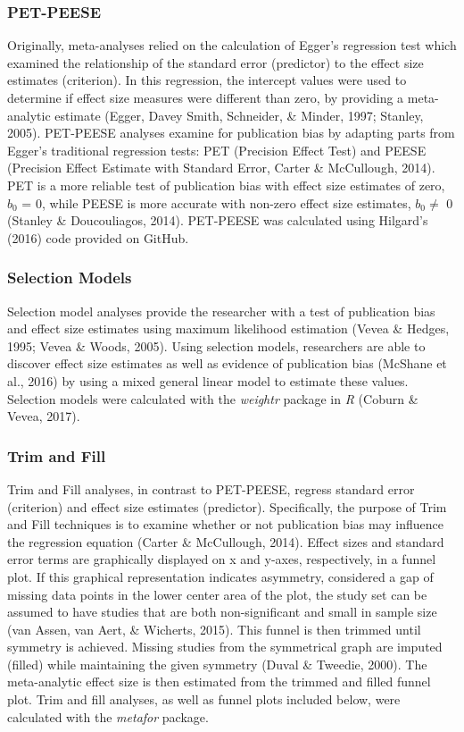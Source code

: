 \documentclass[man, mask]{apa6}
\theoremstyle{definition}
\theoremstyle{definition}
\theoremstyle{definition}
\theoremstyle{remark}
\begin{document}
\subsubsection{PET-PEESE}\label{pet-peese}

Originally, meta-analyses relied on the calculation of Egger's
regression test which examined the relationship of the standard error
(predictor) to the effect size estimates (criterion). In this
regression, the intercept values were used to determine if effect size
measures were different than zero, by providing a meta-analytic estimate
(Egger, Davey Smith, Schneider, \& Minder, 1997; Stanley, 2005).
PET-PEESE analyses examine for publication bias by adapting parts from
Egger's traditional regression tests: PET (Precision Effect Test) and
PEESE (Precision Effect Estimate with Standard Error, Carter \&
McCullough, 2014). PET is a more reliable test of publication bias with
effect size estimates of zero, \(b_0\) = 0, while PEESE is more accurate
with non-zero effect size estimates, \(b_0 \neq\) 0 (Stanley \&
Doucouliagos, 2014). PET-PEESE was calculated using Hilgard's (2016)
code provided on GitHub.

\subsubsection{Selection Models}\label{selection-models}

Selection model analyses provide the researcher with a test of
publication bias and effect size estimates using maximum likelihood
estimation (Vevea \& Hedges, 1995; Vevea \& Woods, 2005). Using
selection models, researchers are able to discover effect size estimates
as well as evidence of publication bias (McShane et al., 2016) by using
a mixed general linear model to estimate these values. Selection models
were calculated with the \emph{weightr} package in \emph{R} (Coburn \&
Vevea, 2017).

\subsubsection{Trim and Fill}\label{trim-and-fill}

Trim and Fill analyses, in contrast to PET-PEESE, regress standard error
(criterion) and effect size estimates (predictor). Specifically, the
purpose of Trim and Fill techniques is to examine whether or not
publication bias may influence the regression equation (Carter \&
McCullough, 2014). Effect sizes and standard error terms are graphically
displayed on x and y-axes, respectively, in a funnel plot. If this
graphical representation indicates asymmetry, considered a gap of
missing data points in the lower center area of the plot, the study set
can be assumed to have studies that are both non-significant and small
in sample size (van Assen, van Aert, \& Wicherts, 2015). This funnel is
then trimmed until symmetry is achieved. Missing studies from the
symmetrical graph are imputed (filled) while maintaining the given
symmetry (Duval \& Tweedie, 2000). The meta-analytic effect size is then
estimated from the trimmed and filled funnel plot. Trim and fill
analyses, as well as funnel plots included below, were calculated with
the \emph{metafor} package.
\end{document}
